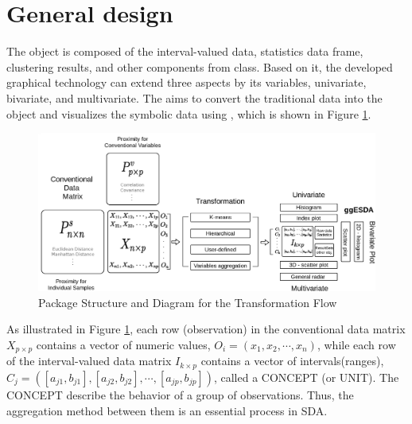 \documentclass[article]{jss}
\begin{document}
 
\section{General design}

The  object is composed of the interval-valued data, statistics data frame, clustering results, and other components from  class. Based on it, the developed graphical technology can extend three aspects by its variables, univariate, bivariate, and multivariate. The  aims to convert the traditional data into the  object and visualizes the symbolic data using , which is shown in Figure \ref{fig:pkgStr}.

\begin{figure}[h]	
  		\centering	 			 	
 	 		\includegraphics[width=1\textwidth]{doc/packageStructure.eps} 
  		\caption{Package Structure and Diagram for the Transformation Flow} 
  		\label{fig:pkgStr}   			 		 
\end{figure}

As illustrated in Figure \ref{fig:pkgStr}, each row (observation) in the conventional data matrix $X_{p \times p}$ contains a vector of numeric values, $O_i = (x_1,x_2,\cdots,x_n)$, while each row of the interval-valued data matrix $I_{k \times p}$ contains a vector of intervals(ranges), $C_j = ([a_{j1},b_{j1}],[a_{j2},b_{j2}],\cdots,[a_{jp},b_{jp}])$, called a CONCEPT (or UNIT). The CONCEPT describe the behavior of a group of observations. Thus, the aggregation method between them is an essential process in SDA.







\end{document}
